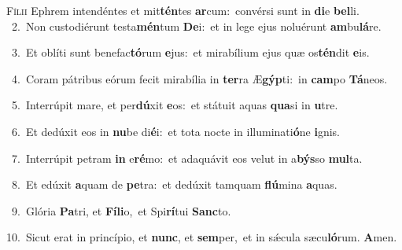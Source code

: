 \lettrine{\initial\textcolor{\initialcolor}{F}}{ílii} Ephrem intendéntes et mit\-\textbf{tén}\-tes \textbf{ar}\-cum:~\star convérsi sunt in \textbf{di}\-e \textbf{bel}\-li.\\
{\numbfont\textcolor{\numbcolor}{~2.}}~Non custodiérunt testa\-\textbf{mén}\-tum \textbf{De}\-i:~\star et in lege ejus noluérunt \textbf{am}\-bu\-\textbf{lá}\-re.\par
{\numbfont\textcolor{\numbcolor}{~3.}}~Et oblíti sunt benefac\-\textbf{tó}\-rum \textbf{e}\-jus:~\star et mirabílium ejus quæ os\-\textbf{tén}\-dit \textbf{e}\-is.\par
{\numbfont\textcolor{\numbcolor}{~4.}}~Coram pátribus eórum fecit mirabília in \textbf{ter}\-ra Æ\-\textbf{gýp}\-ti:~\star in \textbf{cam}\-po \textbf{Tá}\-neos.\par
{\numbfont\textcolor{\numbcolor}{~5.}}~Interrúpit mare, et per\-\textbf{dú}\-xit \textbf{e}\-os:~\star et státuit aquas \textbf{qua}\-si in \textbf{u}\-tre.\par
{\numbfont\textcolor{\numbcolor}{~6.}}~Et dedúxit eos in \textbf{nu}\-be di\-\textbf{é}\-i:~\star et tota nocte in illuminati\-\textbf{ó}\-ne \textbf{i}\-gnis.\par
{\numbfont\textcolor{\numbcolor}{~7.}}~Interrúpit petram \textbf{in} e\-\textbf{ré}\-mo:~\star et adaquávit eos velut in a\-\textbf{býs}\-so \textbf{mul}\-ta.\par
{\numbfont\textcolor{\numbcolor}{~8.}}~Et edúxit \textbf{a}\-quam de \textbf{pe}\-tra:~\star et dedúxit tamquam \textbf{flú}\-mina \textbf{a}\-quas.\par
{\numbfont\textcolor{\numbcolor}{~9.}}~Glória \textbf{Pa}\-tri, et \textbf{Fí}\-\textbf{li}o,~\star et Spi\-\textbf{rí}\-tui \textbf{Sanc}\-to.\par
{\numbfont\textcolor{\numbcolor}{10.}}~Sicut erat in princípio, et \textbf{nunc}\-, et \textbf{sem}\-per,~\star et in sǽcula sæcu\-\textbf{ló}\-rum. \textbf{A}\-men.\par
